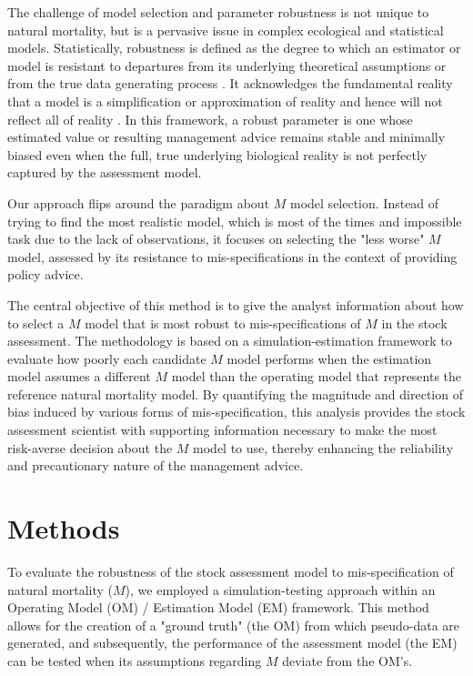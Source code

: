 \documentclass{article}
\begin{document}
The challenge of model selection and parameter robustness is not unique to natural mortality, but is a pervasive issue in complex ecological and statistical models. Statistically, robustness is defined as the degree to which an estimator or model is resistant to departures from its underlying theoretical assumptions or from the true data generating process \cite{HilbornMangel97}. It acknowledges the fundamental reality that a model is a simplification or approximation of reality and hence will not reflect all of reality \cite{burnham2002}. In this framework, a robust parameter is one whose estimated value or resulting management advice remains stable and minimally biased even when the full, true underlying biological reality is not perfectly captured by the assessment model.

Our approach flips around the paradigm about $M$ model selection. Instead of trying to find the most realistic model, which is most of the times and impossible task due to the lack of observations, it focuses on selecting the "less worse" $M$ model, assessed by its resistance to mis-specifications in the context of providing policy advice. 

The central objective of this method is to give the analyst information about how to select a $M$ model that is most robust to mis-specifications of $M$ in the stock assessment. The methodology is based on a simulation-estimation framework to evaluate how poorly each candidate $M$ model performs when the estimation model assumes a different $M$ model than the operating model that represents the reference natural mortality model. By quantifying the magnitude and direction of bias induced by various forms of mis-specification, this analysis provides the stock assessment scientist with supporting information necessary to make the most risk-averse decision about the $M$ model to use, thereby enhancing the reliability and precautionary nature of the management advice.

\section{Methods}

To evaluate the robustness of the stock assessment model to mis-specification of natural mortality ($M$), we employed a simulation-testing approach within an Operating Model (OM) / Estimation Model (EM) framework. This method allows for the creation of a "ground truth" (the OM) from which pseudo-data are generated, and subsequently, the performance of the assessment model (the EM) can be tested when its assumptions regarding $M$ deviate from the OM's. 
\end{document}
